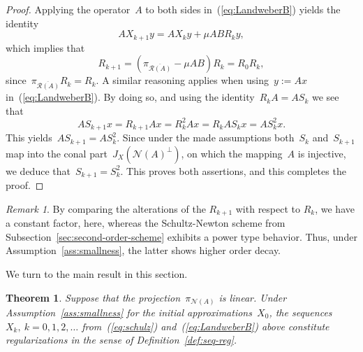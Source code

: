 \documentclass[12pt]{amsart}
\newcommand{\lr}[1]{\left(#1\right)}
\newcommand{\range}{\mathcal R}
\newcommand{\N}{\mathcal N}
\newtheorem{theorem}{Theorem}
\theoremstyle{remark}
\newtheorem{remark}{Remark}
\begin{document}
\begin{proof}
Applying the operator~$A$ to both sides in~(\ref{eq:LandweberB}) yields the identity
\begin{equation}
  \label{eq:11}
  A X_{k+1}y = A X_{k}y + \mu A B R_{k}y,
\end{equation}
which implies that
\begin{equation}
  \label{eq:12}
  R_{k+1} = \lr{\pi_{\overline{\range(A)}}- \mu A B} R_{k} = R_{0}R_{k},
\end{equation}
since~$\pi_{\overline{\range(A)}} R_{k}= R_{k}$.
A similar reasoning applies when
using~$y:= A x$ in~(\ref{eq:LandweberB}). By doing so, and using the
identity~$R_{k}A = A S_{k}$ we see that
$$
A S_{k+1} x= R_{k+1} Ax = R_k^2 Ax = R_k A S_k x= A S_k^2x. 
$$
This yields~$A S_{k+1} = A S_k^2$. Since under the made assumptions both~$S_k$ and~$S_{k+1}$ map into the conal part~$J_X(\N(A)^\perp)$, on which the mapping~$A$ is injective, we deduce that~$S_{k+1} = S_k^2$.
This proves both  assertions, and this completes
the proof.

\end{proof}
\begin{remark}
 By comparing the alterations of the $R_{k+1}$ with respect
  to $R_{k}$, we have a constant factor, here, whereas the Schultz-Newton %
  scheme from Subsection~\ref{sec:second-order-scheme}
  exhibits a power type
  behavior. Thus, under Assumption~\ref{ass:smallness}, the latter shows
  higher order decay.
\end{remark}
 We turn to the main result in this section.
 \begin{theorem}\label{prop:AAM}
  Suppose that the projection~$\pi_{\N(A)}$ is linear.
   Under Assumption~\ref{ass:smallness} for the initial approximations~$X_0$, the sequences~$X_{k},\
   k=0,1,2,\dots$ from~(\ref{eq:schulz}) %
   and~(\ref{eq:LandweberB})  above constitute regularizations in the sense of Definition~\ref{def:seq-reg}.
 \end{theorem}
\end{document}
